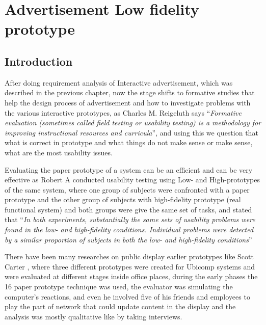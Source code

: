 \chapter{Advertisement Low fidelity prototype} %

\label{Chapter5} %
\newpage


\section{Introduction}
After doing requirement analysis of Interactive advertisement, which was described in the previous chapter, now the stage shifts to formative studies that help the design process of advertisement and how to investigate problems with the various interactive prototypes, as Charles M. Reigeluth \cite{formativestudy} says ``\emph{Formative evaluation (sometimes called field testing or usability testing) is a methodology for improving instructional resources and curricula}'', and using this we question that what is correct in prototype and what things do not make sense or make sense, what are the most usability issues.


Evaluating the paper prototype of a system can be an efficient \cite{lowfidelityefficient} and can be very effective as Robert A \cite{usabilityproblems} conducted usability testing using Low- and High-prototypes of the same system, where one group of subjects were confronted with a paper prototype and the other group of subjects with high-fidelity prototype (real functional system) and both groups were give the same set of tasks, and stated that ``\emph{In both experiments, substantially the same sets of usability problems were found in the low- and high-fidelity conditions. Individual problems were detected by a similar proportion of subjects in both the low- and high-fidelity conditions}''


There have been many researches on public display earlier prototypes like Scott Carter \cite{prototypetesting1}, where three different prototypes were created for Ubicomp systems and were evaluated at different stages inside office places, during the early phases the 16 paper prototype technique was used, the evaluator was simulating the computer’s reactions, and even he involved five of his friends and employees to play the part of network that could update content in the display and the analysis was mostly qualitative like by taking interviews. 



